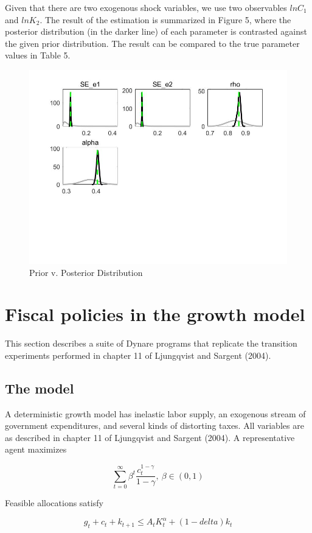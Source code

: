 \documentclass[a4paper,12pt]{scrartcl} %
\begin{document}
Given that there are two exogenous shock variables, we use two observables $lnC_1$ and $lnK_2$. The result of the estimation is summarized in Figure 5, where the posterior distribution (in the darker line) of each parameter is contrasted against the given prior distribution. The result can be compared to the true parameter values in Table 5.

\begin{figure}[htbp!]
		\centering
			\includegraphics[width=0.8\linewidth]{fig5.jpg}
            \caption{Prior v. Posterior Distribution}\label{5}
\end{figure}

\section{Fiscal policies in the growth model}

This section describes a suite of Dynare programs that replicate the transition experiments performed in chapter 11 of Ljungqvist and Sargent (2004).

\subsection{The model}

A deterministic growth model has inelastic labor supply, an exogenous stream of government expenditures, and several kinds of distorting taxes. All variables are as described in chapter 11 of Ljungqvist and Sargent (2004). A representative agent maximizes

$$\sum_{t=0}^{\infty}\beta^t\frac{c_t^{1-\gamma}}{1-\gamma},~\beta \in (0,1)$$

Feasible allocations satisfy

$$g_t+c_t+k_{t+1}\le A_tK_t^{\alpha}+(1-delta)k_t$$
\end{document}
